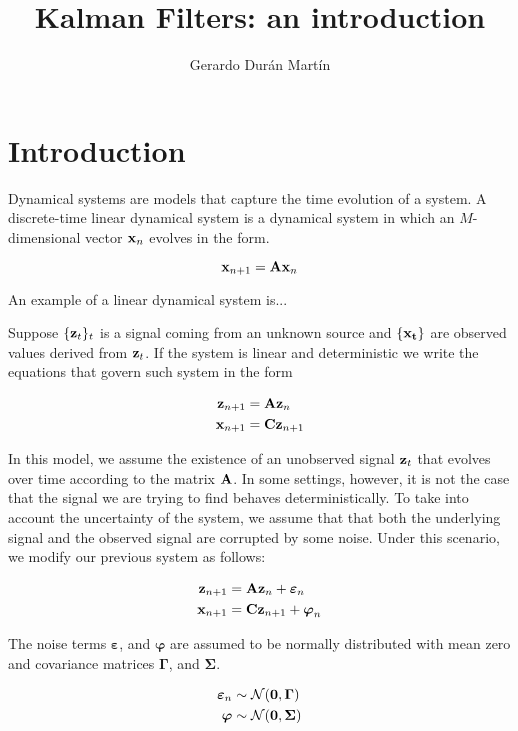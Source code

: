 \documentclass[11pt]{article}
\title{Kalman Filters: an introduction}
\author{Gerardo Durán Martín}
\begin{document}
\maketitle

\section{Introduction}

Dynamical systems are models that capture the time evolution of a system. A discrete-time linear dynamical system is a dynamical system in which an $M$-dimensional vector ${\bf x}_n$ evolves in the form.

\begin{equation}
	{\bf x}_{n+1} = {\bf A x}_n
\end{equation}

An example of a linear dynamical system is...


Suppose $\{{\bf z}_t\}_t$ is a signal coming from an unknown source and $\{{\bf x_t}\}$ are observed values derived from ${\bf z}_t$. If the system is linear and deterministic we write the equations that govern such system in the form

\begin{align*}
	{\bf z}_{n+1} &= {\bf A} {\bf z}_{n}\\
	{\bf x}_{n+1} &= {\bf C} {\bf z}_{n+1}
\end{align*}

In this model, we assume the existence of an unobserved signal ${\bf z}_t$ that evolves over time according to the matrix $\bf A$. In some settings, however, it is not the case that the signal we are trying to find behaves deterministically. To take into account the uncertainty of the system, we assume that that both the underlying signal and the observed signal are corrupted by some noise. Under this scenario, we modify our previous system as follows:
 

\begin{align*}
	{\bf z}_{n+1} &= {\bf A} {\bf z}_{n} + \boldsymbol\varepsilon_n\\
	{\bf x}_{n+1} &= {\bf C} {\bf z}_{n+1} + \boldsymbol\varphi_n
\end{align*}

The noise terms $\boldsymbol{\varepsilon}$, and $\boldsymbol{\varphi}$ are assumed to be normally distributed with mean zero and covariance matrices $\boldsymbol{\Gamma}$, and $\boldsymbol{\Sigma}$.



\begin{align}
	\boldsymbol\varepsilon_n &\sim \mathcal{N}({\bf 0}, \boldsymbol\Gamma)\\
	\boldsymbol\varphi & \sim \mathcal{N}({\bf 0}, \boldsymbol\Sigma)
\end{align}
\end{document}
